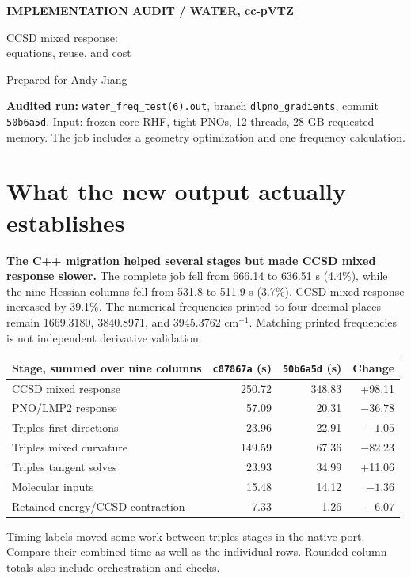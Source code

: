 \documentclass[10pt,letterpaper]{article}
\begin{document}
{\color{teal}\sffamily\bfseries IMPLEMENTATION AUDIT \quad / \quad WATER, cc-pVTZ}\par
{\color{navy}\sffamily\Huge CCSD mixed response:\\equations, reuse, and cost}\par
\vspace{8pt}
{\large Prepared for Andy Jiang}\par
\textbf{Audited run:} \texttt{water\_freq\_test(6).out}, branch \texttt{dlpno\_gradients}, commit \texttt{50b6a5d}. Input: frozen-core RHF, tight PNOs, 12 threads, 28 GB requested memory. The job includes a geometry optimization and one frequency calculation.

\section{What the new output actually establishes}
\textbf{The C++ migration helped several stages but made CCSD mixed response slower.} The complete job fell from 666.14 to 636.51 s (4.4\%), while the nine Hessian columns fell from 531.8 to 511.9 s (3.7\%). CCSD mixed response increased by 39.1\%. The numerical frequencies printed to four decimal places remain 1669.3180, 3840.8971, and 3945.3762 cm$^{-1}$. Matching printed frequencies is not independent derivative validation.

\begin{center}\begin{tabular}{lrrr}\toprule
Stage, summed over nine columns & \texttt{c87867a} (s) & \texttt{50b6a5d} (s) & Change\\\midrule
CCSD mixed response &250.72&348.83&+98.11\\
PNO/LMP2 response &57.09&20.31&$-36.78$\\
Triples first directions &23.96&22.91&$-1.05$\\
Triples mixed curvature &149.59&67.36&$-82.23$\\
Triples tangent solves &23.93&34.99&+11.06\\
Molecular inputs &15.48&14.12&$-1.36$\\
Retained energy/CCSD contraction &7.33&1.26&$-6.07$\\\bottomrule
\end{tabular}\end{center}
\small Timing labels moved some work between triples stages in the native port. Compare their combined time as well as the individual rows. Rounded column totals also include orchestration and checks.\normalsize
\end{document}
